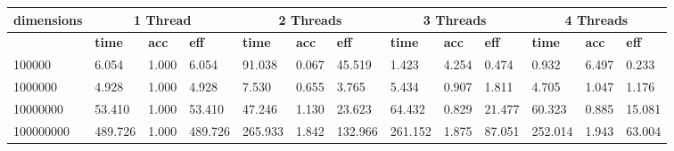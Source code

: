 \documentclass{article}
\begin{document}
\begin{table}[]\begin{tabular}{|l|l|l|l|l|l|l|l|l|l|l|l|l|}\hline
\multicolumn{1}{|c|}{\textbf{dimensions}} & \multicolumn{3}{c|}{\textbf{1 Thread}} & \multicolumn{3}{c|}{\textbf{2 Threads}} & \multicolumn{3}{c|}{\textbf{3 Threads}} & \multicolumn{3}{c|}{\textbf{4 Threads}} \\ \hline
 & \textbf{time} & \textbf{acc} & \textbf{eff} & \textbf{time} & \textbf{acc} & \textbf{eff} & \textbf{time} & \textbf{acc} & \textbf{eff} & \textbf{time} & \textbf{acc} & \textbf{eff}\\ \hline
100000
 & 6.054 & 1.000 & 6.054 & 91.038 & 0.067 & 45.519 & 1.423 & 4.254 & 0.474 & 0.932 & 6.497 & 0.233\\ \hline
1000000
 & 4.928 & 1.000 & 4.928 & 7.530 & 0.655 & 3.765 & 5.434 & 0.907 & 1.811 & 4.705 & 1.047 & 1.176\\ \hline
10000000
 & 53.410 & 1.000 & 53.410 & 47.246 & 1.130 & 23.623 & 64.432 & 0.829 & 21.477 & 60.323 & 0.885 & 15.081\\ \hline
100000000
 & 489.726 & 1.000 & 489.726 & 265.933 & 1.842 & 132.966 & 261.152 & 1.875 & 87.051 & 252.014 & 1.943 & 63.004\\ \hline
\end{tabular}
\end{table}
\end{document}
